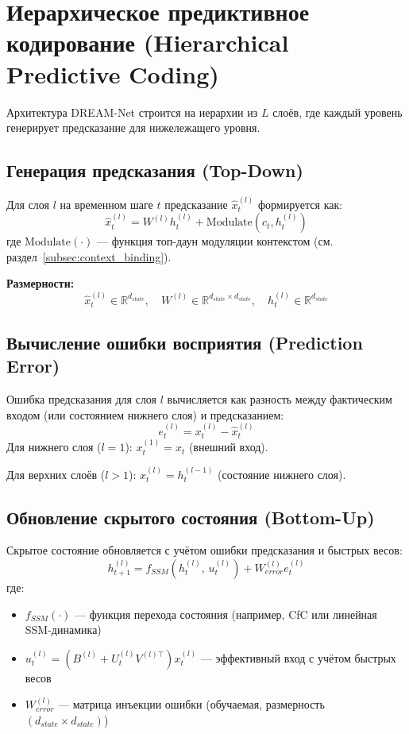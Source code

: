 \section{Иерархическое предиктивное кодирование (Hierarchical Predictive Coding)}

Архитектура DREAM-Net строится на иерархии из $L$ слоёв, где каждый уровень генерирует предсказание для нижележащего уровня.

\subsection{Генерация предсказания (Top-Down)}

Для слоя $l$ на временном шаге $t$ предсказание $\hat{x}_t^{(l)}$ формируется как:
\begin{equation}
\hat{x}_t^{(l)} = W^{(l)} h_t^{(l)} + \text{Modulate}(c_t, h_t^{(l)})
\label{eq:prediction}
\end{equation}
где $\text{Modulate}(\cdot)$ — функция топ-даун модуляции контекстом (см. раздел~\ref{subsec:context_binding}).

\textbf{Размерности:}
\[
\hat{x}_t^{(l)} \in \mathbb{R}^{d_{state}}, \quad W^{(l)} \in \mathbb{R}^{d_{state} \times d_{state}}, \quad h_t^{(l)} \in \mathbb{R}^{d_{state}}
\]

\subsection{Вычисление ошибки восприятия (Prediction Error)}

Ошибка предсказания для слоя $l$ вычисляется как разность между фактическим входом (или состоянием нижнего слоя) и предсказанием:
\begin{equation}
e_t^{(l)} = x_t^{(l)} - \hat{x}_t^{(l)}
\label{eq:error}
\end{equation}
Для нижнего слоя ($l=1$): $x_t^{(1)} = x_t$ (внешний вход).

Для верхних слоёв ($l > 1$): $x_t^{(l)} = h_t^{(l-1)}$ (состояние нижнего слоя).

\subsection{Обновление скрытого состояния (Bottom-Up)}

Скрытое состояние обновляется с учётом ошибки предсказания и быстрых весов:
\begin{equation}
h_{t+1}^{(l)} = f_{SSM}\left(h_t^{(l)}, \, u_t^{(l)}\right) + W_{error}^{(l)} e_t^{(l)}
\label{eq:state_update}
\end{equation}
где:
\begin{itemize}
    \item $f_{SSM}(\cdot)$ — функция перехода состояния (например, CfC или линейная SSM-динамика)
    \item $u_t^{(l)} = \left(B^{(l)} + U_t^{(l)} V^{(l)\top}\right) x_t^{(l)}$ — эффективный вход с учётом быстрых весов
    \item $W_{error}^{(l)}$ — матрица инъекции ошибки (обучаемая, размерность $(d_{state} \times d_{state})$)
\end{itemize}

